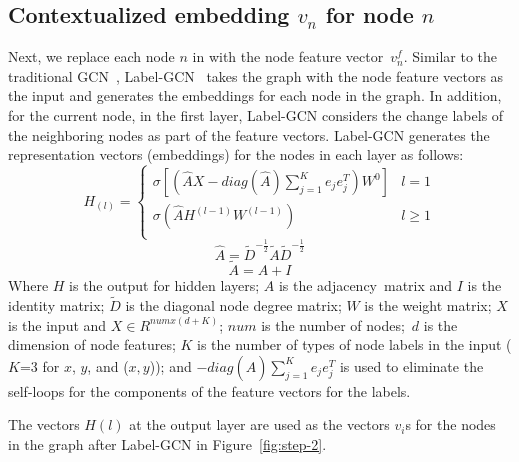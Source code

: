 \subsection{Contextualized embedding $v_n$ for node $n$}
\label{label-gcn-compute}

Next, we replace each node $n$ in {\mvpdgxy} with the node feature
vector~$v^{f}_n$.
Similar to the traditional GCN~\cite{gcn}, Label-GCN~\cite{label-gcn}
takes the graph with the node feature vectors as the input and
generates the embeddings for each node in the graph. In addition, for
the current node, in the first layer, Label-GCN considers the change
labels of the neighboring nodes as part of the feature vectors.
Label-GCN generates the representation vectors (embeddings) for the nodes in each
layer as follows:
\begin{equation}\label{eq1}
	H_{(l)} = 
	\begin{cases}
		\sigma [(\hat{A}X-diag(\hat{A})\sum_{j=1}^{K}e_je^T_j)W^0] &  l = 1\\
		\sigma (\hat{A}H^{(l-1)}W^{(l-1)}) &  l \geq 1\\
	\end{cases}
\end{equation}
\begin{equation}\label{eq2}
	\hat{A} = \tilde{D}^{-\frac{1}{2}}\tilde{A}\tilde{D}^{-\frac{1}{2}}
\end{equation}
\begin{equation}\label{eq3}
	\tilde{A} = A + I
\end{equation}
Where $H$ is the output for hidden layers; $A$ is the
adjacency~matrix and $I$ is the identity matrix; $\tilde{D}$ is the diagonal node degree matrix; $W$
is the weight matrix; $X$ is the input and $X \in R^{numx(d+K)}$;
$num$ is the number of nodes;~$d$ is the dimension of node features;
$K$ is the number of types of node labels in the input ($K$=3 for $x$,
$y$, and ($x,y$)); and $-diag(\hat{A})\sum_{j=1}^{K}e_je^T_j$ is used
to eliminate the self-loops for the components of the feature vectors
for the labels.

The vectors $H(l)$ at the output layer are used as the vectors $v_i$s
for the nodes in the {\mvpdgxy} graph after Label-GCN in Figure~\ref{fig:step-2}.



